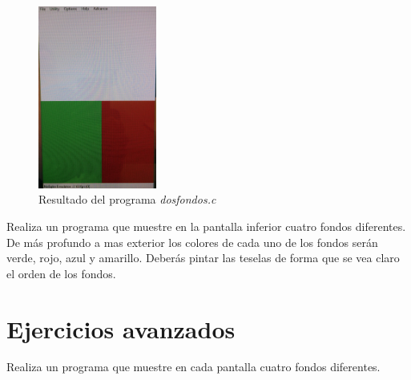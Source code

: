 \begin{figure}[t]
	\centering
	\includegraphics[height=6cm]{Figuras/C7/c7_dosfondos.jpg}
	\caption{Resultado del programa \textit{dosfondos.c}}
	\label{c7_fig:dosfondos}
\end{figure}


\begin{exercise}
	Realiza un programa que muestre en la pantalla inferior cuatro fondos diferentes. De más profundo a mas exterior los colores de cada uno de los fondos serán verde, rojo, azul y amarillo. Deberás pintar las teselas de forma que se vea claro el orden de los fondos.
\end{exercise}

\section{Ejercicios avanzados}
\begin{exercise}
	Realiza un programa que muestre en cada pantalla cuatro fondos diferentes.
\end{exercise}
	